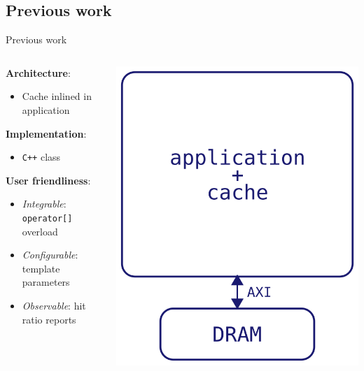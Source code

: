 \documentclass[aspectratio=169]{beamer}
\begin{document}
\subsection{Previous work}
\begin{frame}{Previous work}
	\begin{columns}
		\begin{column}{.5\textwidth}
			\vfill
			\textbf{Architecture}:
			\begin{itemize}
				\item Cache inlined in application
			\end{itemize}

			\textbf{Implementation}:
			\begin{itemize}
				\item \texttt{C++} class
			\end{itemize}

			\textbf{User friendliness}:
			\begin{itemize}
				\item \emph{Integrable}: \texttt{operator[]} overload
				\item \emph{Configurable}: template parameters
				\item \emph{Observable}: hit ratio reports
			\end{itemize}
		\end{column}
		\begin{column}{.5\textwidth}
			\begin{center}
				\includegraphics[height=.5\textheight]{liang_arch}
			\end{center}
		\end{column}
	\end{columns}
\end{frame}
\end{document}
